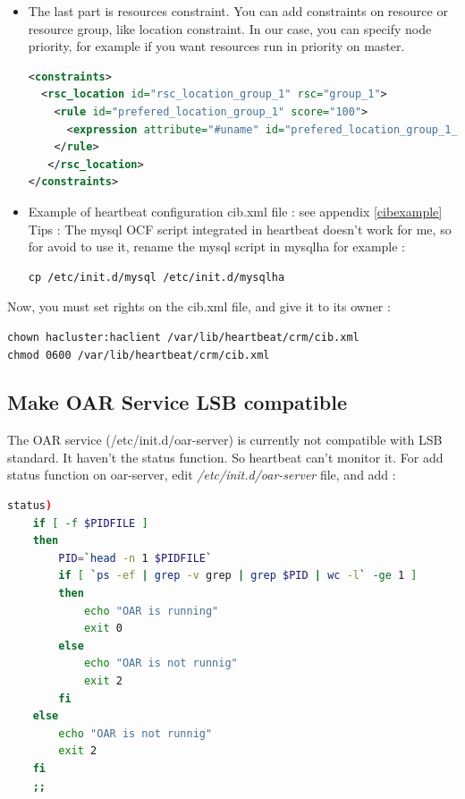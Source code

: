 \documentclass[a4paper,10pt]{report}
\begin{document}
\begin{itemize}
\begin{itemize}
\end{itemize}

\item The last part is resources constraint. You can add constraints on resource or resource group, like location constraint.
In our case, you can specify node priority, for example if you want resources run in priority on master.
\begin{lstlisting}[language=xml]
<constraints>
  <rsc_location id="rsc_location_group_1" rsc="group_1">
    <rule id="prefered_location_group_1" score="100">
      <expression attribute="#uname" id="prefered_location_group_1_expr" operation="eq" value="NODE-NAME"/>
    </rule>
   </rsc_location>
</constraints>
\end{lstlisting}

\item Example of heartbeat configuration cib.xml file : see appendix \ref{cibexample}\\

Tips : The mysql OCF script integrated in heartbeat doesn't work for me, so for avoid to use it, rename the mysql script in mysqlha for example :
\begin{lstlisting}
cp /etc/init.d/mysql /etc/init.d/mysqlha
\end{lstlisting}

\end{itemize}

Now, you must set rights on the cib.xml file, and give it to its owner :
\begin{lstlisting}
chown hacluster:haclient /var/lib/heartbeat/crm/cib.xml
chmod 0600 /var/lib/heartbeat/crm/cib.xml
\end{lstlisting}




\subsection{Make OAR Service LSB compatible}
The OAR service (/etc/init.d/oar-server) is currently not compatible with LSB standard. It haven't the status function. So heartbeat can't monitor it.
For add status function on oar-server, edit \textit{/etc/init.d/oar-server} file, and add :
\begin{lstlisting}[language=bash]
status)
	if [ -f $PIDFILE ]
	then
		PID=`head -n 1 $PIDFILE`
		if [ `ps -ef | grep -v grep | grep $PID | wc -l` -ge 1 ]
		then
			echo "OAR is running"
			exit 0
		else
			echo "OAR is not runnig"
			exit 2
		fi
	else
		echo "OAR is not runnig"
		exit 2
	fi
	;;
\end{lstlisting}
\end{document}
